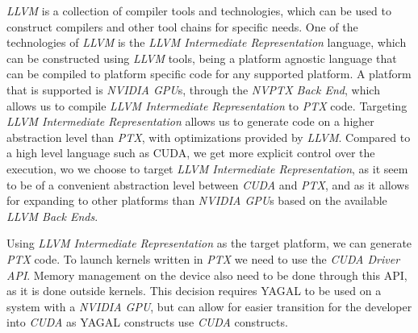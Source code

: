 \textit{LLVM} is a collection of compiler tools and technologies, which can be used to construct compilers and other tool chains for specific needs. One of the technologies of \textit{LLVM} is the \textit{LLVM Intermediate Representation} language, which can be constructed using \textit{LLVM} tools, being a platform agnostic language that can be compiled to platform specific code for any supported platform. A platform that is supported is \textit{NVIDIA GPU}s, through the \textit{NVPTX Back End}, which allows us to compile \textit{LLVM Intermediate Representation} to \textit{PTX} code. Targeting \textit{LLVM Intermediate Representation} allows us to generate code on a higher abstraction level than \textit{PTX}, with optimizations provided by \textit{LLVM}. Compared to a high level language such as CUDA, we get more explicit control over the execution, wo we choose to target \textit{LLVM Intermediate Representation}, as it seem to be of a convenient abstraction level between \textit{CUDA} and \textit{PTX}, and as it allows for expanding to other platforms than \textit{NVIDIA GPU}s based on the available \textit{LLVM Back Ends}.

Using \textit{LLVM Intermediate Representation} as the target platform, we can generate \textit{PTX} code. To launch kernels written in \textit{PTX} we need to use the \textit{CUDA Driver API}. Memory management on the device also need to be done through this API, as it is done outside kernels. This decision requires YAGAL to be used on a system with a \textit{NVIDIA GPU}, but can allow for easier transition for the developer into \textit{CUDA} as YAGAL constructs use \textit{CUDA} constructs.